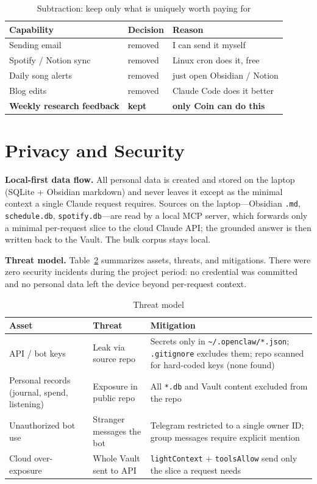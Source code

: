 \documentclass[conference]{IEEEtran}
\begin{document}
\begin{table}[t]
\caption{Subtraction: keep only what is uniquely worth paying for}
\label{tab:subtraction}
\centering
\footnotesize
\begin{tabular}{@{}llp{3.0cm}@{}}
\toprule
\textbf{Capability} & \textbf{Decision} & \textbf{Reason} \\
\midrule
Sending email          & removed   & I can send it myself \\
Spotify / Notion sync  & removed   & Linux cron does it, free \\
Daily song alerts      & removed   & just open Obsidian / Notion \\
Blog edits             & removed   & Claude Code does it better \\
\textbf{Weekly research feedback} & \textbf{kept} & \textbf{only Coin can do this} \\
\bottomrule
\end{tabular}
\end{table}

\section{Privacy and Security}
\textbf{Local-first data flow.} All personal data is created and stored on the
laptop (SQLite + Obsidian markdown) and never leaves it except as the minimal
context a single Claude request requires. Sources on the laptop---Obsidian
\texttt{.md}, \texttt{schedule.db}, \texttt{spotify.db}---are read by a local MCP
server, which forwards only a minimal per-request slice to the cloud Claude API;
the grounded answer is then written back to the Vault. The bulk corpus stays local.

\textbf{Threat model.} Table~\ref{tab:threat} summarizes assets, threats, and
mitigations. There were zero security incidents during the project period: no
credential was committed and no personal data left the device beyond per-request
context.

\begin{table}[t]
\caption{Threat model}
\label{tab:threat}
\centering
\footnotesize
\begin{tabular}{@{}lll@{}}
\toprule
\textbf{Asset} & \textbf{Threat} & \textbf{Mitigation} \\
\midrule
API / bot keys & Leak via source repo & Secrets only in \texttt{\textasciitilde/.openclaw/*.json}; \texttt{.gitignore} excludes them; repo scanned for hard-coded keys (none found) \\
Personal records (journal, spend, listening) & Exposure in public repo & All \texttt{*.db} and Vault content excluded from the repo \\
Unauthorized bot use & Stranger messages the bot & Telegram restricted to a single owner ID; group messages require explicit mention \\
Cloud over-exposure & Whole Vault sent to API & \texttt{lightContext} + \texttt{toolsAllow} send only the slice a request needs \\
\bottomrule
\end{tabular}
\end{table}
\end{document}
